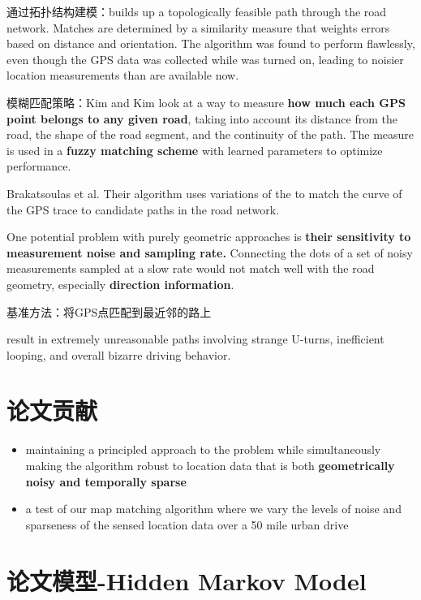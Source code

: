 通过拓扑结构建模：builds up a
topologically feasible path through the road network. Matches are
determined by a similarity measure that weights errors based on
distance and orientation. The algorithm was found to perform flawlessly, even though the GPS data was collected while
 was turned on, leading to noisier location
measurements than are available now.

模糊匹配策略：Kim and Kim look at a
way to measure \textbf{how much each GPS point belongs to any given road}, taking into account its distance from the road, the shape of
the road segment, and the continuity of the path. The measure is
used in a \textbf{fuzzy matching scheme} with learned parameters to
optimize performance.

Brakatsoulas et al. Their
algorithm uses variations of the  to match the
curve of the GPS trace to candidate paths in the road network.

\begin{remark}
    One potential problem with purely geometric approaches is \textbf{their
sensitivity to measurement noise and sampling rate.} 
Connecting the dots of a set of noisy measurements sampled at a
slow rate would not match well with the road geometry, especially
\textbf{direction information}.
\end{remark}

基准方法：将GPS点匹配到最近邻的路上

\begin{remark}
    result in extremely unreasonable paths involving strange U-turns, inefficient looping, and overall bizarre driving
behavior.
\end{remark}

\section{论文贡献}

\begin{itemize}
    \item maintaining a principled approach to the problem while simultaneously making the algorithm robust to location data that is both \textbf{geometrically noisy and temporally sparse}
    \item a test of our map matching algorithm where we vary the levels of noise and sparseness of the sensed location data over a 50 mile urban drive
\end{itemize}

\section{论文模型-Hidden Markov Model}

